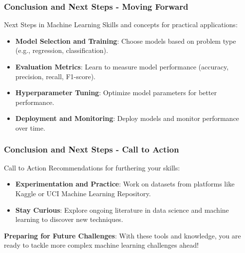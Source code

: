 \documentclass[aspectratio=169]{beamer}
\begin{document}
\begin{frame}[fragile]
  \frametitle{Conclusion and Next Steps - Moving Forward}
  
  \begin{block}{Next Steps in Machine Learning}
    Skills and concepts for practical applications:
  \end{block}
  
  \begin{itemize}
    \item \textbf{Model Selection and Training}: Choose models based on problem type (e.g., regression, classification).
    \item \textbf{Evaluation Metrics}: Learn to measure model performance (accuracy, precision, recall, F1-score).
    \item \textbf{Hyperparameter Tuning}: Optimize model parameters for better performance.
    \item \textbf{Deployment and Monitoring}: Deploy models and monitor performance over time.
  \end{itemize}
\end{frame}

\begin{frame}[fragile]
  \frametitle{Conclusion and Next Steps - Call to Action}
  
  \begin{block}{Call to Action}
    Recommendations for furthering your skills:
  \end{block}
  
  \begin{itemize}
    \item \textbf{Experimentation and Practice}: Work on datasets from platforms like Kaggle or UCI Machine Learning Repository.
    \item \textbf{Stay Curious}: Explore ongoing literature in data science and machine learning to discover new techniques.
  \end{itemize}
  
  \textbf{Preparing for Future Challenges}: 
  With these tools and knowledge, you are ready to tackle more complex machine learning challenges ahead!
\end{frame}
\end{document}
